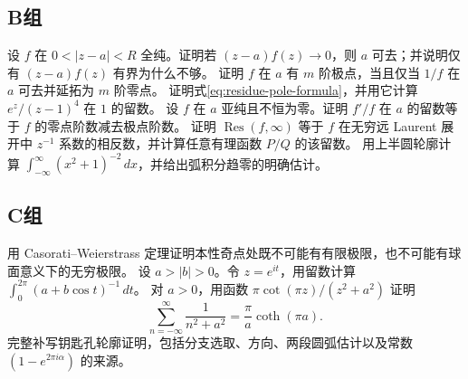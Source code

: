 \subsection*{B组}
\begin{enumerate}[label=\textbf{\thechapter.\arabic*.},resume]
设 \(f\) 在 \(0<|z-a|<R\) 全纯。证明若 \((z-a)f(z)\to0\)，则 \(a\) 可去；并说明仅有 \((z-a)f(z)\) 有界为什么不够。
证明 \(f\) 在 \(a\) 有 \(m\) 阶极点，当且仅当 \(1/f\) 在 \(a\) 可去并延拓为 \(m\) 阶零点。
证明式\eqref{eq:residue-pole-formula}，并用它计算 \(e^z/(z-1)^4\) 在 \(1\) 的留数。
设 \(f\) 在 \(a\) 亚纯且不恒为零。证明 \(f'/f\) 在 \(a\) 的留数等于 \(f\) 的零点阶数减去极点阶数。
证明 \(\operatorname{Res}(f,\infty)\) 等于 \(f\) 在无穷远 Laurent 展开中 \(z^{-1}\) 系数的相反数，并计算任意有理函数 \(P/Q\) 的该留数。
用上半圆轮廓计算
\(\int_{-\infty}^{\infty}(x^2+1)^{-2}\,dx\)，并给出弧积分趋零的明确估计。
\end{enumerate}
\subsection*{C组}
\begin{enumerate}[label=\textbf{\thechapter.\arabic*.},resume]
用 Casorati--Weierstrass 定理证明本性奇点处既不可能有有限极限，也不可能有球面意义下的无穷极限。
设 \(a>|b|>0\)。令 \(z=e^{it}\)，用留数计算
\(\int_0^{2\pi}(a+b\cos t)^{-1}\,dt\)。
对 \(a>0\)，用函数
\(\pi\cot(\pi z)/(z^2+a^2)\) 证明
\[
 \sum_{n=-\infty}^{\infty}\frac1{n^2+a^2}
 =\frac{\pi}{a}\coth(\pi a).
\]
完整补写钥匙孔轮廓证明，包括分支选取、方向、两段圆弧估计以及常数
\((1-e^{2\pi i\alpha})\) 的来源。
\end{enumerate}
